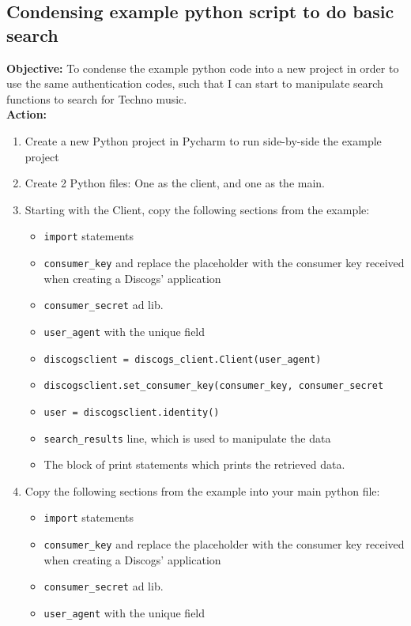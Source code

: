 \documentclass{article}
\begin{document}
\subsection{Condensing example python script to do basic search}
\textbf{Objective:} To condense the example python code into a new project in order to use the same authentication codes, such that I can start to manipulate search functions to search for Techno music.\\
\textbf{Action:}
\begin{enumerate}
    \item Create a new Python project in Pycharm to run side-by-side the example project
    \item Create 2 Python files: One as the client, and one as the main.
    \item Starting with the Client, copy the following sections from the example:
    \begin{itemize}
        \item \texttt {import} statements
        \item \verb|consumer_key| and replace the placeholder with the consumer key received when creating a Discogs' application
        \item \verb|consumer_secret| ad lib.
        \item \verb|user_agent| with the unique field
        \item \verb|discogsclient = discogs_client.Client(user_agent)|
        \item \verb|discogsclient.set_consumer_key(consumer_key, consumer_secret|
        \item \verb|user = discogsclient.identity()|
        \item \verb|search_results| line, which is used to manipulate the data
        \item The block of print statements which prints the retrieved data.
    \end{itemize}
    \item Copy the following sections from the example into your main python file:
    \begin{itemize}
        \item \texttt {import} statements
        \item \verb|consumer_key| and replace the placeholder with the consumer key received when creating a Discogs' application
        \item \verb|consumer_secret| ad lib.
        \item \verb|user_agent| with the unique field

\end{itemize}
\end{enumerate}
\end{document}
